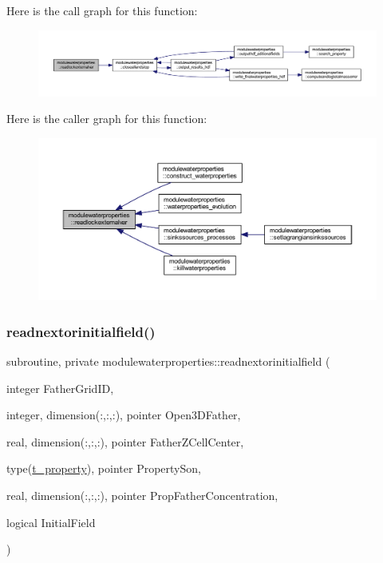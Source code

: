 Here is the call graph for this function\+:\nopagebreak
\begin{figure}[H]
\begin{center}
\leavevmode
\includegraphics[width=350pt]{namespacemodulewaterproperties_a463922f7665f0f3507bff58df80af6f7_cgraph}
\end{center}
\end{figure}
Here is the caller graph for this function\+:\nopagebreak
\begin{figure}[H]
\begin{center}
\leavevmode
\includegraphics[width=350pt]{namespacemodulewaterproperties_a463922f7665f0f3507bff58df80af6f7_icgraph}
\end{center}
\end{figure}
\mbox{\label{namespacemodulewaterproperties_a70dce18437eed5f486027590c6d6a511}} 
\subsubsection{\texorpdfstring{readnextorinitialfield()}{readnextorinitialfield()}}
{\footnotesize\ttfamily subroutine, private modulewaterproperties\+::readnextorinitialfield (\begin{DoxyParamCaption}\item[{integer}]{Father\+Grid\+ID,  }\item[{integer, dimension(\+:,\+:,\+:), pointer}]{Open3\+D\+Father,  }\item[{real, dimension(\+:,\+:,\+:), pointer}]{Father\+Z\+Cell\+Center,  }\item[{type(\mbox{\hyperlink{structmodulewaterproperties_1_1t__property}{t\+\_\+property}}), pointer}]{Property\+Son,  }\item[{real, dimension(\+:,\+:,\+:), pointer}]{Prop\+Father\+Concentration,  }\item[{logical}]{Initial\+Field }\end{DoxyParamCaption})\hspace{0.3cm}{\ttfamily [private]}}


